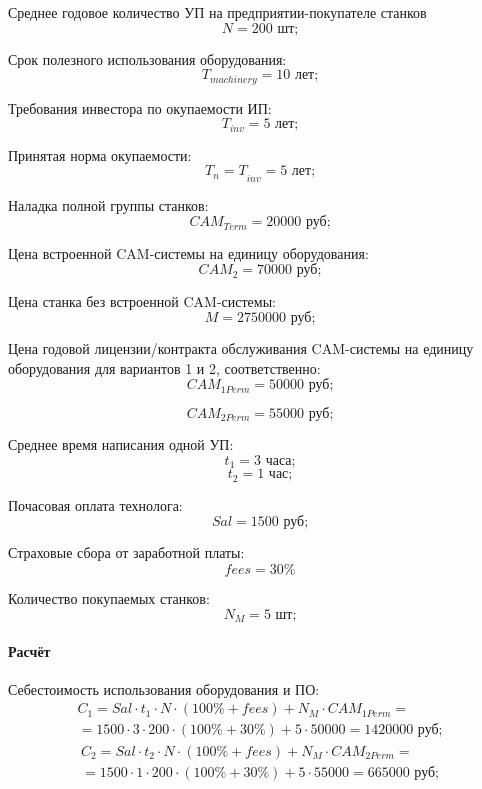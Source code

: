 Среднее годовое количество УП на предприятии-покупателе станков
\[N=200 \text{ шт;}\]

Срок полезного использования оборудования:
\[T_{machinery}=10 \text{ лет;}\]

Требования инвестора по окупаемости ИП:
\[T_{inv}=5 \text{ лет;}\]

Принятая норма окупаемости:
\[{T_n=T}_{inv}=5 \text{ лет;}\]

Наладка полной группы станков:
\[{CAM}_{Term}=20000 \text{ руб;}\]

Цена встроенной CAM-системы на единицу оборудования:
\[{CAM}_2=70000 \text{ руб;}\]

Цена станка без встроенной CAM-системы:
\[M=2750000 \text{ руб;}\]

Цена годовой лицензии/контракта обслуживания CAM-системы на единицу оборудования для вариантов 1 и 2, соответственно:
\[{CAM}_{1Perm}=50000 \text{ руб;}\]

\[{CAM}_{2Perm}=55000 \text{ руб;}\]

Среднее время написания одной УП:
\[t_1=3 \text{ часа;}\]
\[t_2=1 \text{ час;}\]

Почасовая оплата технолога:
\[Sal=1500 \text{ руб;}\]

Страховые сбора от заработной платы:
\[fees=30\%\]

Количество покупаемых станков:
\[N_M=5 \text{ шт;}\]

\paragraph{Расчёт}\label{par:ecocalc}
\nopagebreak

Себестоимость использования оборудования и ПО:
\begin{equation}
	\begin{aligned}
		C_1 = Sal \cdot t_1\cdot N \cdot(100\%+fees)+N_M \cdot CAM_{1Perm} =\\= 1500 \cdot 3 \cdot 200 \cdot (100\%+30\%)+5 \cdot 50000=1 420 000 \text{ руб;}
	\end{aligned}
\end{equation}
\begin{equation}
	\begin{aligned}
		C_2 = Sal \cdot t_2\cdot N \cdot(100\%+fees)+N_M \cdot CAM_{2Perm} =\\= 1500 \cdot 1 \cdot 200 \cdot (100\%+30\%)+5 \cdot 55000=665 000 \text{ руб;}
	\end{aligned}
\end{equation}

